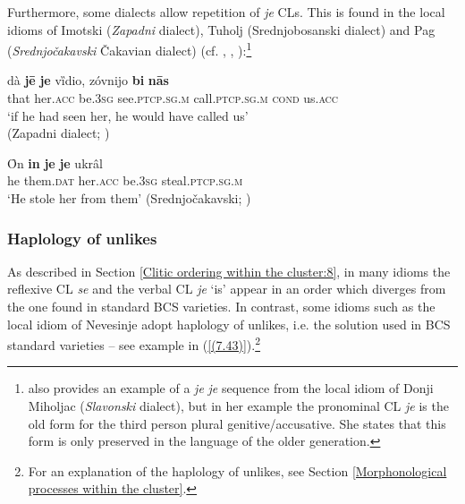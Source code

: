\noindent Furthermore, some dialects allow repetition of \textit{je} CLs. This is found in the local idioms of Imotski (\textit{Zapadni} dialect), Tuholj (Srednjobosanski dialect) and Pag (\textit{Srednjočakavski} Čakavian dialect) (cf. \citealt[120]{Simundic71}, \citealt[322]{Halilovic90}, \citealt[165]{Vranic03}):\footnote{\citet[109]{Golic93} also provides an example of a \textit{je} \textit{je} sequence from the local idiom of Donji Miholjac (\textit{Slavonski} dialect), but in her example the pronominal CL \textit{je} is the old form for the third person plural genitive/accusative. She states that this form is only preserved in the language of the older generation.}  

\begin{exe}\ex\label{(7.41)}
\gll dà  \textbf{jē}  \textbf{je}  vȉdio, zóvnijo  \textbf{bi}  \textbf{nās}  \\
that  her.\textsc{acc}  be.3\textsc{sg}  see.\textsc{ptcp.sg.m} call.\textsc{ptcp.sg.m} \textsc{cond}  us.\textsc{acc} \\
\glt ‘if he had seen her, he would have called us’ \\
\hfill  (Zapadni dialect; \citealt[120]{Simundic71})

\ex\label{(7.42)}
\gll Ȏn  \textbf{in}  \textbf{je}  \textbf{je}  ukrâl  \\
he them.\textsc{dat}  her.\textsc{acc} be.3\textsc{sg}  steal.\textsc{ptcp.sg.m} \\
\glt ‘He stole her from them’
\hfill  (Srednjočakavski; \citealt[165]{Vranic03})
\end{exe}

\subsubsection{Haplology of unlikes}

As described in Section \ref{Clitic ordering within the cluster:8}, in many idioms the reflexive CL \textit{se} and the verbal CL \textit{je} ‘is’ appear in an order which diverges from the one found in standard BCS varieties. In contrast, some idioms such as the local idiom of Nevesinje adopt haplology of unlikes, i.e. the solution used in BCS standard varieties – see example in (\ref{(7.43)}).\footnote{For an explanation of the haplology of unlikes, see Section \ref{Morphonological processes within the cluster}.}


